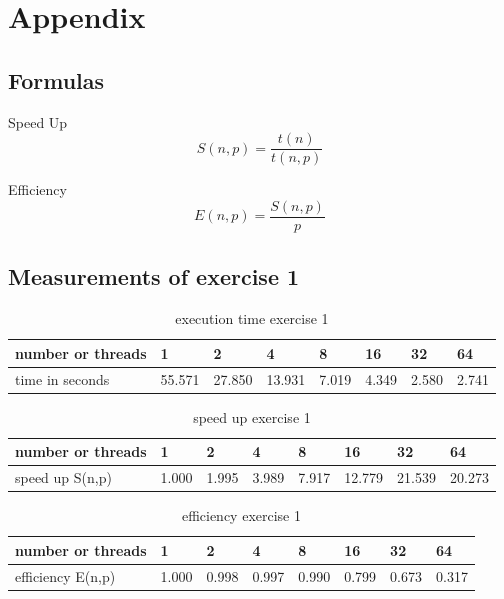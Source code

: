 \documentclass[11pt,a4paper]{article}
\begin{document}
\pagebreak

\section{Appendix}

\subsection{Formulas}
Speed Up 
$$ S(n,p) = \frac{t(n)}{t(n,p)} $$

Efficiency 
$$ E(n,p) = \frac{S(n,p)}{p} $$

\subsection{Measurements of exercise 1}

\begin{table}[h]
\centering
\label{measuresEx1}
\begin{tabular}{@{}l||l|l|l|l|l|l|l|@{}}
number or threads & 1      & 2      & 4      & 8     & 16    & 32    & 64    \\
\hline	
time in seconds   & 55.571 & 27.850 & 13.931 & 7.019 & 4.349 & 2.580 & 2.741
\end{tabular}
\caption{execution time exercise 1}
\end{table}

\begin{table}[h]
\centering
\label{measuresSpeedUpEx1}
\begin{tabular}{@{}l||l|l|l|l|l|l|l|@{}}
number or threads & 1      & 2      & 4      & 8     & 16    & 32    & 64    \\
\hline	
speed up S(n,p)   & 1.000 & 1.995 & 3.989 & 7.917 & 12.779 & 21.539 & 20.273
\end{tabular}
\caption{speed up exercise 1}
\end{table}

\begin{table}[h]
\centering
\label{measuresSpeedUpEx1}
\begin{tabular}{@{}l||l|l|l|l|l|l|l|@{}}
number or threads & 1      & 2      & 4      & 8     & 16    & 32    & 64    \\
\hline	
efficiency E(n,p)   & 1.000 & 0.998  & 0.997 & 0.990 & 0.799 & 0.673 & 0.317
\end{tabular}
\caption{efficiency exercise 1}
\end{table}



\listoffigures

\listoftables






\end{document}
